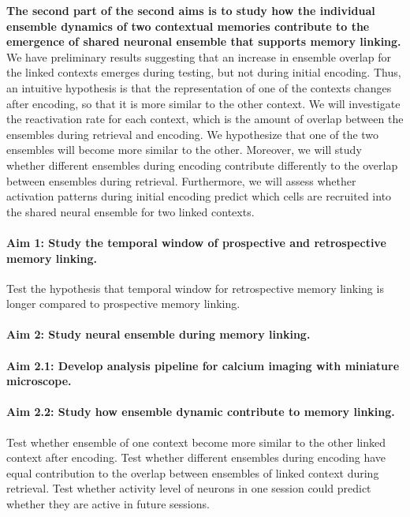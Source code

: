 \documentclass[master.tex]{subfiles}
\begin{document}
\textbf{The second part of the second aims is to study how the individual
  ensemble dynamics of two contextual memories contribute to the emergence of
  shared neuronal ensemble that supports memory linking.} We have preliminary
results suggesting that an increase in ensemble overlap for the linked contexts
emerges during testing, but not during initial encoding. Thus, an intuitive
hypothesis is that the representation of one of the contexts changes after
encoding, so that it is more similar to the other context. We will investigate
the reactivation rate for each context, which is the amount of overlap between
the ensembles during retrieval and encoding. We hypothesize that one of the two
ensembles will become more similar to the other. Moreover, we will study whether
different ensembles during encoding contribute differently to the overlap
between ensembles during retrieval. Furthermore, we will assess whether
activation patterns during initial encoding predict which cells are recruited
into the shared neural ensemble for two linked contexts.

\paragraph{Aim 1: Study the temporal window of prospective and retrospective
  memory linking.}

Test the hypothesis that temporal window for retrospective memory linking is
longer compared to prospective memory linking.

\paragraph{Aim 2: Study neural ensemble during memory linking.}

\paragraph{Aim 2.1: Develop analysis pipeline for calcium imaging with miniature
  microscope.}

\paragraph{Aim 2.2: Study how ensemble dynamic contribute to memory linking.}

Test whether ensemble of one context become more similar to the other linked
context after encoding. Test whether different ensembles during encoding have
equal contribution to the overlap between ensembles of linked context during
retrieval. Test whether activity level of neurons in one session could predict
whether they are active in future sessions.

\newpage
\end{document}
